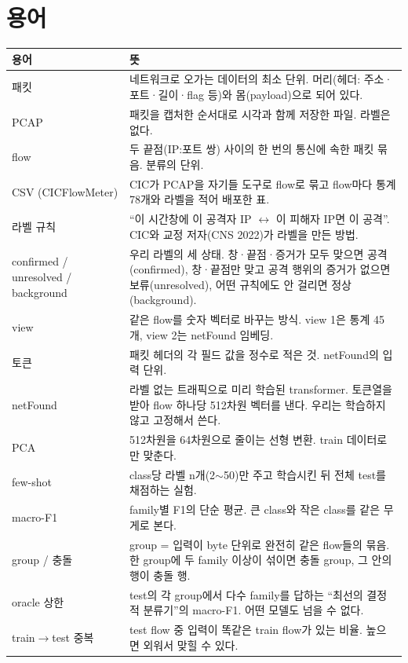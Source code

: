 \section{용어}
\begin{tabularx}{\linewidth}{p{.2\linewidth}Y}
\toprule 용어 & 뜻\\\midrule
패킷 & 네트워크로 오가는 데이터의 최소 단위. 머리(헤더: 주소·포트·길이·flag 등)와 몸(payload)으로 되어 있다.\\
PCAP & 패킷을 캡처한 순서대로 시각과 함께 저장한 파일. 라벨은 없다.\\
flow & 두 끝점(IP:포트 쌍) 사이의 한 번의 통신에 속한 패킷 묶음. 분류의 단위.\\
CSV (CICFlowMeter) & CIC가 PCAP을 자기들 도구로 flow로 묶고 flow마다 통계 78개와 라벨을 적어 배포한 표.\\
라벨 규칙 & ``이 시간창에 이 공격자 IP $\leftrightarrow$ 이 피해자 IP면 이 공격''. CIC와 교정 저자(CNS 2022)가 라벨을 만든 방법.\\
confirmed / unresolved / background & 우리 라벨의 세 상태. 창·끝점·증거가 모두 맞으면 공격(confirmed), 창·끝점만 맞고 공격 행위의 증거가 없으면 보류(unresolved), 어떤 규칙에도 안 걸리면 정상(background).\\
view & 같은 flow를 숫자 벡터로 바꾸는 방식. view 1은 통계 45개, view 2는 netFound 임베딩.\\
토큰 & 패킷 헤더의 각 필드 값을 정수로 적은 것. netFound의 입력 단위.\\
netFound & 라벨 없는 트래픽으로 미리 학습된 transformer. 토큰열을 받아 flow 하나당 512차원 벡터를 낸다. 우리는 학습하지 않고 고정해서 쓴다.\\
PCA & 512차원을 64차원으로 줄이는 선형 변환. train 데이터로만 맞춘다.\\
few-shot & class당 라벨 n개(2$\sim$50)만 주고 학습시킨 뒤 전체 test를 채점하는 실험.\\
macro-F1 & family별 F1의 단순 평균. 큰 class와 작은 class를 같은 무게로 본다.\\
group / 충돌 & group = 입력이 byte 단위로 완전히 같은 flow들의 묶음. 한 group에 두 family 이상이 섞이면 충돌 group, 그 안의 행이 충돌 행.\\
oracle 상한 & test의 각 group에서 다수 family를 답하는 ``최선의 결정적 분류기''의 macro-F1. 어떤 모델도 넘을 수 없다.\\
train$\to$test 중복 & test flow 중 입력이 똑같은 train flow가 있는 비율. 높으면 외워서 맞힐 수 있다.\\
\bottomrule
\end{tabularx}


